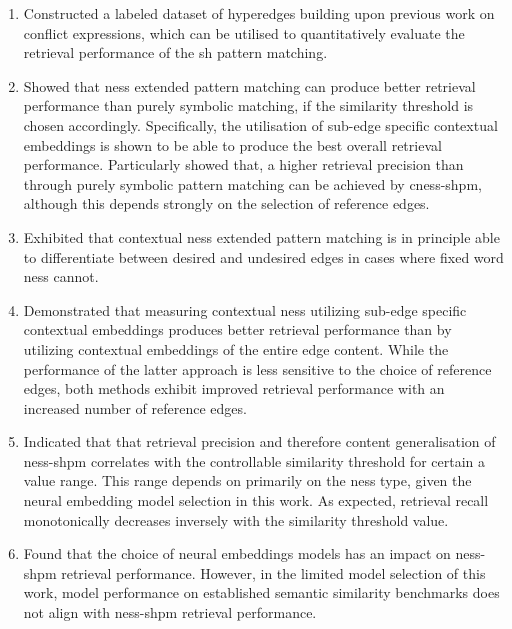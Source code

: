 \documentclass[11pt]{scrreprt}
\begin{document}
{\begin{enumerate}[label=\textbf{C.\arabic*}, leftmargin=0pt, labelwidth=*, align=left, labelsep=0.5em, itemindent=0pt, listparindent=\parindent]
\item Constructed a labeled dataset of hyperedges building upon previous work on conflict expressions, which can be utilised to quantitatively evaluate the retrieval performance of the \gls{sh} pattern matching.

\item Showed that \gls{ness} extended pattern matching can produce better retrieval performance than purely symbolic matching, if the similarity threshold is chosen accordingly. Specifically, the utilisation of sub-edge specific contextual embeddings is shown to be able to produce the best overall retrieval performance. Particularly showed that, a higher retrieval precision than through purely symbolic pattern matching can be achieved by \gls{cness-shpm}, although this depends strongly on the selection of reference edges.

\item Exhibited that contextual \gls{ness} extended pattern matching is in principle able to differentiate between desired and undesired edges in cases where fixed word \gls{ness} cannot.

\item Demonstrated that measuring contextual \gls{ness} utilizing sub-edge specific contextual embeddings produces better retrieval performance than by utilizing contextual embeddings of the entire edge content. While the performance of the latter approach is less sensitive to the choice of reference edges, both methods exhibit improved retrieval performance with an increased number of reference edges.

\item Indicated that that retrieval precision and therefore content generalisation of \gls{ness-shpm} correlates with the controllable similarity threshold for certain a value range. This range depends on primarily on the \gls{ness} type, given the neural embedding model selection in this work. 
As expected, retrieval recall monotonically decreases inversely with the similarity threshold value.

\item Found that the choice of neural embeddings models has an impact on \gls{ness-shpm} retrieval performance. However, in the limited model selection of this  work, model performance on established semantic similarity benchmarks does not align with \gls{ness-shpm} retrieval performance.


\end{enumerate}}
\end{document}
